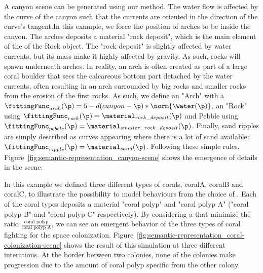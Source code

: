A canyon scene can be generated using our method. The water flow is affected by the curve of the canyon such that the currents are oriented in the direction of the curve's tangent.In this example, we force the position of arches to be inside the canyon. The arches deposits a material "rock deposit", which is the main element of the  of the Rock object. The "rock deposit" is slightly affected by water currents, but its mass make it highly affected by gravity. As such, rocks will spawn underneath arches. In reality, an arch is often created as part of a large coral boulder that sees the calcareous bottom part detached by the water currents, often resulting in an arch surrounded by big rocks and smaller rocks from the erosion of the first rocks.
As such, we define an  "Arch" with a  $\fittingFunc_{arch}(\p) = 5 - d(canyon - \p) * \norm{\Water(\p)}$, an  "Rock" using $\fittingFunc_{rock}(\p) = \material_{rock\_deposit}(\p)$ and Pebble using $\fittingFunc_{pebble}(\p) = \material_{smaller\_rock\_deposit}(\p)$. Finally, sand ripples are simply described as curves appearing where there is a lot of sand available: $\fittingFunc_{ripple}(\p) = \material_{sand}(\p)$.
Following these simple rules, Figure~\ref{fig:semantic-representation_canyon-scene} shows the emergence of details in the scene. 

In this example we defined three different types of corals, coralA, coralB and coralC, to illustrate the possibility to model behaviours from the choice of . Each of the coral types deposits a material "coral polyp" and "coral polyp A" ("coral polyp B" and "coral polyp C" respectively). By considering a  that minimize the ratio $\frac{\text{coral polyp}}{\text{coral polyp A}}$, we can see an emergent behavior of the three types of coral fighting for the space colonization.
Figure~\ref{fig:semantic-representation_coral-colonization-scene} shows the result of this simulation at three different interations. At the border between two colonies, none of the colonies make progression due to the amount of coral polyp specific from the other colony.

